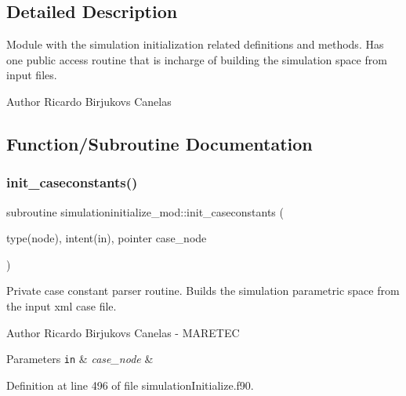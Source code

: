 \subsection{Detailed Description}
Module with the simulation initialization related definitions and methods. Has one public access routine that is incharge of building the simulation space from input files. 

\begin{DoxyAuthor}{Author}
Ricardo Birjukovs Canelas 
\end{DoxyAuthor}


\subsection{Function/\+Subroutine Documentation}
\mbox{\label{namespacesimulationinitialize__mod_ae41256ca5e72ebf27660ffdfe5c08e46}} 
\subsubsection{\texorpdfstring{init\+\_\+caseconstants()}{init\_caseconstants()}}
{\footnotesize\ttfamily subroutine simulationinitialize\+\_\+mod\+::init\+\_\+caseconstants (\begin{DoxyParamCaption}\item[{type(node), intent(in), pointer}]{case\+\_\+node }\end{DoxyParamCaption})\hspace{0.3cm}{\ttfamily [private]}}



Private case constant parser routine. Builds the simulation parametric space from the input xml case file. 

\begin{DoxyAuthor}{Author}
Ricardo Birjukovs Canelas -\/ M\+A\+R\+E\+T\+EC 
\end{DoxyAuthor}

\begin{DoxyParams}[1]{Parameters}
\mbox{\tt in}  & {\em case\+\_\+node} & \\
\hline
\end{DoxyParams}


Definition at line 496 of file simulation\+Initialize.\+f90.


